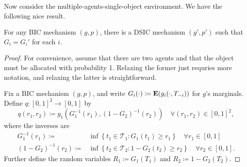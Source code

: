 \documentclass[11pt,letterpaper,reqno,oneside]{article}
\begin{document}
Now consider the multiple-agents-single-object environment. We have the following nice result.
%
\begin{theorem}
	\label{theorem:BIC_DSIC}
	For any BIC mechanism $(g,p)$, there is a DSIC mechanism $(g',p')$ such that $G_i = G_i'$ for each $i$.
\end{theorem}

\begin{proof}
	For convenience, assume that there are two agents and that the object must be allocated with probability 1. Relaxing the former just requries more notation, and relaxing the latter is straightforward.

	Fix a BIC mechanism $(g,p)$, and write $G_i(\cdot) \coloneqq \mathbf{E}( g_i(\cdot,T_{-i}) )$ for $g$'s marginals. Define $q : [0,1]^2 \to [0,1]$ by
	\begin{equation*}
		q(r_1,r_2) 
		\coloneqq g_1\left( G_1^{-1}(r_1), (1-G_2)^{-1}(r_2) \right) 
		\quad\forall (r_1,r_2) \in [0,1]^2 ,
	\end{equation*}
	where the inverses are
	\begin{align*}
		G_1^{-1}(r_1) \coloneqq{}& \inf\left\{ 
		t_1 \in \mathcal{T}_1 : G_1(t_1) \geq r_1
		\right\} 
		\quad \forall r_1 \in [0,1] 
		\\
		(1-G_2)^{-1}(r_2) \coloneqq{}& \inf\left\{ 
		t_2 \in \mathcal{T}_2 : 1 - G_2(t_2) \geq r_2
		\right\} 
		\quad \forall r_2 \in [0,1] .
	\end{align*}
	Further define the random variables $R_1 \coloneqq G_1(T_1)$ and $R_2 \coloneqq 1 - G_2(T_2)$.


\end{proof}
\end{document}
